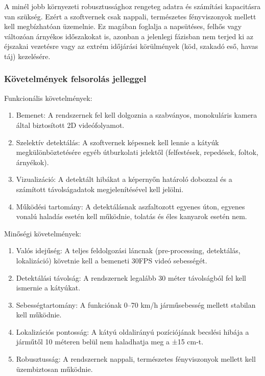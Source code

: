 A minél jobb környezeti robusztussághoz rengeteg adatra és számítási
kapacitásra van szükség. Ezért a szoftvernek csak nappali, természetes
fényviszonyok mellett kell megbízhatóan üzemelnie. Ez magában foglalja a
napsütéses, felhős vagy változóan árnyékos időszakokat is, azonban a
jelenlegi fázisban nem terjed ki az éjszakai vezetésre vagy az extrém
időjárási körülmények (köd, szakadó eső, havas táj) kezelésére.

\subsubsection{\texorpdfstring{Követelmények felsorolás jelleggel
}{Követelmények felsorolás jelleggel }}\label{kuxf6vetelmuxe9nyek-felsoroluxe1s-jelleggel}

Funkcionális követelmények:

\begin{enumerate}
\def\labelenumi{\arabic{enumi}.}
\item
  Bemenet: A rendszernek fel kell dolgoznia a szabványos, monokuláris
  kamera által biztosított 2D videófolyamot.
\item
  Szelektív detektálás: A szoftvernek képesnek kell lennie a kátyúk
  megkülönböztetésére egyéb útburkolati jelektől (felfestések,
  repedések, foltok, árnyékok).
\item
  Vizualizáció: A detektált hibákat a képernyőn határoló dobozzal és a
  számított távolságadatok megjelenítésével kell jelölni.
\item
  Működési tartomány: A detektálásnak aszfaltozott egyenes úton, egyenes
  vonalú haladás esetén kell működnie, tolatás és éles kanyarok esetén
  nem.
\end{enumerate}

Minőségi követelmények:

\begin{enumerate}
\def\labelenumi{\arabic{enumi}.}
\item
  Valós idejűség: A teljes feldolgozási láncnak (pre-processing,
  detektálás, lokalizáció) követnie kell a bemeneti 30FPS videó
  sebességét.
\item
  Detektálási távolság: A rendszernek legalább 30 méter távolságból fel
  kell ismernie a kátyúkat.
\item
  Sebességtartomány: A funkciónak 0--70 km/h járműsebesség mellett
  stabilan kell működnie.
\item
  Lokalizációs pontosság: A kátyú oldalirányú pozíciójának becslési
  hibája a járműtől 10 méteren belül nem haladhatja meg a ±15 cm-t.
\item
  Robusztusság: A rendszernek nappali, természetes fényviszonyok mellett
  kell üzembiztosan működnie.
\end{enumerate}

